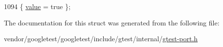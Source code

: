 \begin{DoxyCode}
1094 \{ \hyperlink{structtesting_1_1internal_1_1StaticAssertTypeEqHelper_3_01T_00_01T_01_4_acdb69a9c4164628ea6a80bd6442058c6a63c475f543e4e977d43c5093dd2b7f3f}{value} = \textcolor{keyword}{true} \};
\end{DoxyCode}


The documentation for this struct was generated from the following file\+:\begin{DoxyCompactItemize}
\item 
vendor/googletest/googletest/include/gtest/internal/\hyperlink{gtest-port_8h}{gtest-\/port.\+h}\end{DoxyCompactItemize}
